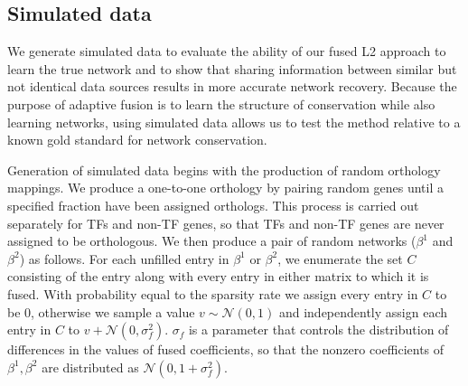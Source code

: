 \documentclass[11pt]{article}
\begin{document}



\subsection{Simulated data}
We generate simulated data to evaluate the ability of our fused L2 approach to learn the true network and to show that sharing information between similar but not identical data sources results in more accurate network recovery. Because the purpose of adaptive fusion is to learn the structure of conservation while also learning networks, using simulated data allows us to test the method relative to a known gold standard for network conservation. 


Generation of simulated data begins with the production of random orthology mappings. We produce a one-to-one orthology by pairing random genes until a specified fraction have been assigned orthologs. This process is carried out separately for TFs and non-TF genes, so that TFs and non-TF genes are never assigned to be orthologous. We then produce a pair of random networks ($\beta^1$ and $\beta^2$) as follows. For each unfilled entry in $\beta^1$ or $\beta^2$, we enumerate the set $C$ consisting of the entry along with every entry in either matrix to which it is fused. With probability equal to the sparsity rate we assign every entry in $C$ to be 0, otherwise we sample a value $v \sim \mathcal{N}(0,1)$ and independently assign each entry in $C$ to $v + \mathcal{N}(0, \sigma_f^2)$. $\sigma_f$ is a parameter that controls the distribution of differences in the values of fused coefficients, so that the nonzero coefficients of $\beta^1, \beta^2$ are distributed as $\mathcal{N}(0, 1 + \sigma_f^2)$.
\end{document}
